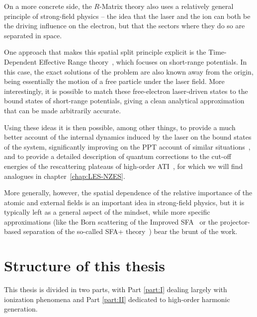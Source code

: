 On a more concrete side, the $R$-Matrix theory also uses a relatively general principle of strong-field physics -- the idea that the laser and the ion can both be the driving influence on the electron, but that the sectors where they do so are separated in space.

One approach that makes this spatial split principle explicit is the Time-Dependent Effective Range theory~\cite{frolov_model-independent_2003, frolov_effective-range-theory_2008}, which focuses on short-range potentials. In this case, the exact solutions of the problem are also known away from the origin, being essentially the motion of a free particle under the laser field. More interestingly, it is possible to match these free-electron laser-driven states to the bound states of short-range potentials, giving a clean analytical approximation that can be made arbitrarily accurate.

Using these ideas it is then possible, among other things, to provide a much better account of the internal dynamics induced by the laser on the bound states of the system, significantly improving on the PPT account of similar situations~\cite{frolov_effective-range-theory_2008}, and to provide a detailed description of quantum corrections to the cut-off energies of the rescattering plateaus of high-order ATI~\cite{HATI_quantum_correction_2}, for which we will find analogues in chapter~\ref{chap:LES-NZES}.

More generally, however, the spatial dependence of the relative importance of the atomic and external fields is an important idea in strong-field physics, but it is typically left as a general aspect of the mindset, while more specific approximations (like the Born scattering of the Improved SFA~\cite{milosevic_ISFA-standard_2007} or the projector-based separation of the so-called SFA+ theory~\cite{perez-hernandez_sfa-plus_2009}) bear the brunt of the work.













\section{Structure of this thesis}
This thesis is divided in two parts, with Part \ref{part:I} dealing largely with ionization phenomena and Part \ref{part:II} dedicated to high-order harmonic generation. 

